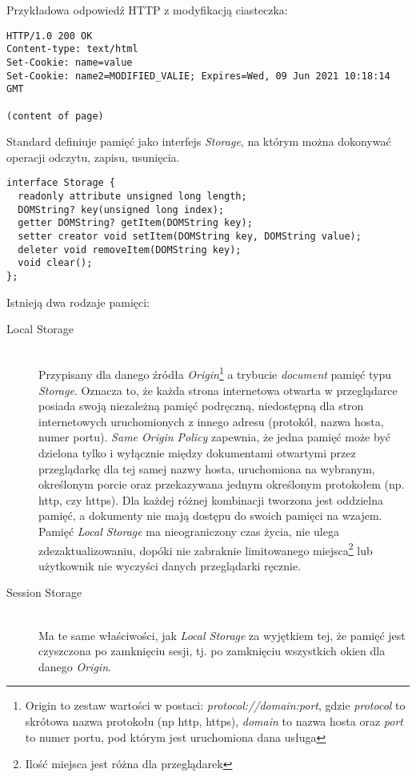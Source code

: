 Przykładowa odpowiedź HTTP z modyfikacją ciasteczka:
\lstset{language=Octave}
\begin{lstlisting}
HTTP/1.0 200 OK
Content-type: text/html
Set-Cookie: name=value
Set-Cookie: name2=MODIFIED_VALIE; Expires=Wed, 09 Jun 2021 10:18:14 GMT

(content of page)
\end{lstlisting}

Standard definiuje pamięć jako interfejs \emph{Storage}, na którym można dokonywać operacji odczytu, zapisu, usunięcia.

\lstset{language=Octave}
\begin{lstlisting}
interface Storage {
  readonly attribute unsigned long length;
  DOMString? key(unsigned long index);
  getter DOMString? getItem(DOMString key);
  setter creator void setItem(DOMString key, DOMString value);
  deleter void removeItem(DOMString key);
  void clear();
};
\end{lstlisting}

Istnieją dwa rodzaje pamięci:

\begin{description}
  \item[Local Storage] \hfill \\
  Przypisany dla danego źródła \emph{Origin}\footnote{Origin to zestaw wartości w postaci: \emph{protocol://domain:port}, gdzie \emph{protocol} to skrótowa nazwa protokołu (np http, https), \emph{domain} to nazwa hosta oraz \emph{port} to numer portu, pod którym jest uruchomiona dana usługa} a trybucie \emph{document} pamięć typu \emph{Storage}. Oznacza to, że każda strona internetowa otwarta w przeglądarce posiada swoją niezależną pamięć podręczną, niedostępną dla stron internetowych uruchomionych z innego adresu (protokół, nazwa hosta, numer portu). \emph{Same Origin Policy} zapewnia, że jedna pamięć może być dzielona tylko i wyłącznie między dokumentami otwartymi przez przeglądarkę dla tej samej nazwy hosta, uruchomiona na wybranym, określonym porcie oraz przekazywana jednym określonym protokołem (np. http, czy https). Dla każdej różnej kombinacji tworzona jest oddzielna pamięć, a dokumenty nie mają dostępu do swoich pamięci na wzajem. Pamięć \emph{Local Storage} ma nieograniczony czas życia, nie ulega zdezaktualizowaniu, dopóki nie zabraknie limitowanego miejsca\footnote{Ilość miejsca jest różna dla przeglądarek} lub użytkownik nie wyczyści danych przeglądarki ręcznie.
  \item[Session Storage] \hfill \\
  Ma te same właściwości, jak \emph{Local Storage} za wyjętkiem tej, że pamięć jest czyszczona po zamknięciu sesji, tj. po zamknięciu wszystkich okien dla danego \emph{Origin}.
\end{description}

